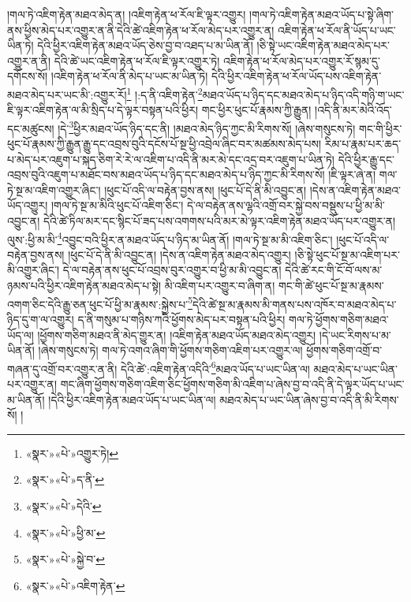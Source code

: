 །གལ་ཏེ་འཇིག་རྟེན་མཐའ་མེད་ན། །འཇིག་རྟེན་ཕ་རོལ་ཇི་ལྟར་འགྱུར། །གལ་ཏེ་འཇིག་རྟེན་མཐའ་ཡོད་པ་སྟེ་ཞིག་ནས་ཕྱིས་མེད་པར་འགྱུར་ན་ནི་དེའི་ཚེ་འཇིག་རྟེན་ཕ་རོལ་མེད་པར་འགྱུར་ན། འཇིག་རྟེན་ཕ་རོལ་ནི་ཡོད་པ་ཡང་ཡིན་ཏེ། དེའི་ཕྱིར་འཇིག་རྟེན་མཐའ་ཡོད་ཅེས་བྱ་བ་འཐད་པ་མ་ཡིན་ནོ། །ཅི་སྟེ་ཡང་འཇིག་རྟེན་མཐའ་མེད་པར་འགྱུར་ན་ནི། དེའི་ཚེ་ཡང་འཇིག་རྟེན་ཕ་རོལ་ཇི་ལྟར་འགྱུར་ཏེ། འཇིག་རྟེན་ཕ་རོལ་མེད་པར་འགྱུར་རོ་སྙམ་དུ་དགོངས་སོ། །འཇིག་རྟེན་ཕ་རོལ་ནི་མེད་པ་ཡང་མ་ཡིན་ཏེ། དེའི་ཕྱིར་འཇིག་རྟེན་ཕ་རོལ་ཡོད་པས་འཇིག་རྟེན་མཐའ་མེད་པར་ཡང་མི་:འགྱུར་རོ།\footnote{«སྣར་»«པེ་»འགྱུར་ཏེ།} །:ད་ནི་འཇིག་རྟེན་\footnote{«སྣར་»«པེ་»ད་ནི་}མཐའ་ཡོད་པ་ཉིད་དང་མཐའ་མེད་པ་ཉིད་འདི་གཉི་ག་ཡང་ཇི་ལྟར་འཇིག་རྟེན་ལ་མི་སྲིད་པ་དེ་ལྟར་བསྟན་པའི་ཕྱིར། གང་ཕྱིར་ཕུང་པོ་རྣམས་ཀྱི་རྒྱུན། །འདི་ནི་མར་མེའི་འོད་དང་མཚུངས། །དེ་\footnote{«སྣར་»«པེ་»དེའི་}ཕྱིར་མཐའ་ཡོད་ཉིད་དང་ནི། །མཐའ་མེད་ཉིད་ཀྱང་མི་རིགས་སོ། །ཞེས་གསུངས་ཏེ། གང་གི་ཕྱིར་ཕུང་པོ་རྣམས་ཀྱི་རྒྱུན་རྒྱུ་དང་འབྲས་བུའི་དངོས་པོ་སྔ་ཕྱི་འབྲེལ་ཞིང་བར་མཚམས་མེད་པས། རིམ་པ་རྣམ་པར་ཆད་པ་མེད་པར་འཇུག་པ་སྐད་ཅིག་རེ་རེ་ལ་འཇིག་པ་འདི་ནི་མར་མེ་དང་འདྲ་བར་འཇུག་པ་ཡིན་ཏེ། དེའི་ཕྱིར་རྒྱུ་དང་འབྲས་བུའི་འཇུག་པ་མཐོང་བས་མཐའ་ཡོད་པ་ཉིད་དང་མཐའ་མེད་པ་ཉིད་ཀྱང་མི་རིགས་སོ། །ཇི་ལྟར་ཞེ་ན། གལ་ཏེ་སྔ་མ་འཇིག་འགྱུར་ཞིང་། །ཕུང་པོ་འདི་ལ་བརྟེན་བྱས་ནས། །ཕུང་པོ་དེ་ནི་མི་འབྱུང་ན། །དེས་ན་འཇིག་རྟེན་མཐའ་ཡོད་འགྱུར། །གལ་ཏེ་སྔ་མ་མིའི་ཕུང་པོ་འཇིག་ཅིང་། དེ་ལ་བརྟེན་ནས་ལྷའི་འགྲོ་བར་སྐྱེ་བས་བསྡུས་པ་ཕྱི་མ་མི་འབྱུང་ན། དེའི་ཚེ་ཏིལ་མར་དང་སྙིང་པོ་ཟད་པས་འགགས་པའི་མར་མེ་ལྟར་འཇིག་རྟེན་མཐའ་ཡོད་པར་འགྱུར་ན། ལུས་:ཕྱི་མ་མི་\footnote{«སྣར་»«པེ་»ཕྱི་མ་}འབྱུང་བའི་ཕྱིར་ན་མཐའ་ཡོད་པ་ཉིད་མ་ཡིན་ནོ། །གལ་ཏེ་སྔ་མ་མི་འཇིག་ཅིང་། །ཕུང་པོ་འདི་ལ་བརྟེན་བྱས་ནས། །ཕུང་པོ་དེ་ནི་མི་འབྱུང་ན། །དེས་ན་འཇིག་རྟེན་མཐའ་མེད་འགྱུར། །ཅི་སྟེ་ཕུང་པོ་སྔ་མ་འཇིག་པར་མི་འགྱུར་ཞིང་། དེ་ལ་བརྟེན་ནས་ཕུང་པོ་འབྲས་བུར་འགྱུར་བ་ཕྱི་མ་མི་འབྱུང་ན། དེའི་ཚེ་རང་གི་ངོ་བོ་ལས་མ་ཉམས་པའི་ཕྱིར་འཇིག་རྟེན་མཐའ་མེད་པ་སྟེ། མི་འཇིག་པར་འགྱུར་བ་ཞིག་ན། གང་གི་ཚེ་ཕུང་པོ་སྔ་མ་རྣམས་འགག་ཅིང་དེའི་རྒྱུ་ཅན་ཕུང་པོ་ཕྱི་མ་རྣམས་:སྐྱེས་པ་\footnote{«སྣར་»«པེ་»སྐྱེ་བ་}དེའི་ཚེ་སྔ་མ་རྣམས་མི་གནས་པས་འཁོར་བ་མཐའ་མེད་པ་ཉིད་དུ་ག་ལ་འགྱུར། ད་ནི་གསུམ་པ་གཉིས་ཀའི་ཕྱོགས་མེད་པར་བསྟན་པའི་ཕྱིར། གལ་ཏེ་ཕྱོགས་གཅིག་མཐའ་ཡོད་ལ། །ཕྱོགས་གཅིག་མཐའ་ནི་མེད་གྱུར་ན། །འཇིག་རྟེན་མཐའ་ཡོད་མཐའ་མེད་འགྱུར། །དེ་ཡང་རིགས་པ་མ་ཡིན་ནོ། །ཞེས་གསུངས་ཏེ། གལ་ཏེ་འགའ་ཞིག་གི་ཕྱོགས་གཅིག་འཇིག་པར་འགྱུར་ལ། ཕྱོགས་གཅིག་འགྲོ་བ་གཞན་དུ་འགྲོ་བར་འགྱུར་ན་ནི། དེའི་ཚེ་:འཇིག་རྟེན་འདིའི་\footnote{«སྣར་»«པེ་»འཇིག་རྟེན་}མཐའ་ཡོད་པ་ཡང་ཡིན་ལ། མཐའ་མེད་པ་ཡང་ཡིན་པར་འགྱུར་ན། གང་ཞིག་ཕྱོགས་གཅིག་འཇིག་ཅིང་ཕྱོགས་གཅིག་མི་འཇིག་པ་ཞེས་བྱ་བ་འདི་ནི་དེ་ལྟར་ཡོད་པ་ཡང་མ་ཡིན་ནོ། །དེའི་ཕྱིར་འཇིག་རྟེན་མཐའ་ཡོད་པ་ཡང་ཡིན་ལ། མཐའ་མེད་པ་ཡང་ཡིན་ཞེས་བྱ་བ་འདི་ནི་མི་རིགས་སོ། །

